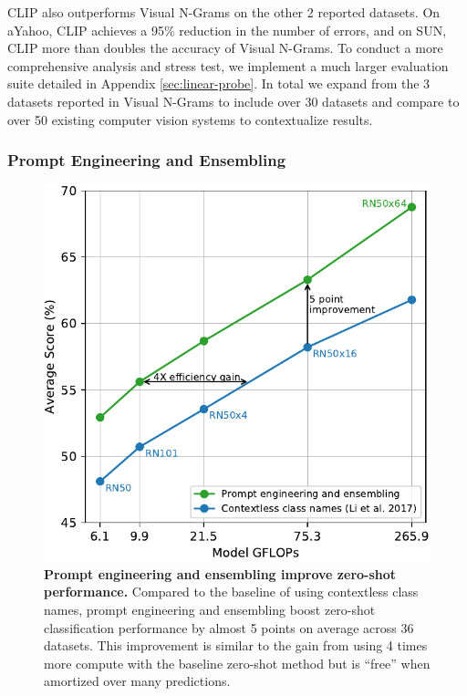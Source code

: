 \documentclass{article}
\begin{document}
CLIP also outperforms Visual N-Grams on the other 2 reported datasets. On aYahoo, CLIP achieves a 95\% reduction in the number of errors, and on SUN, CLIP more than doubles the accuracy of Visual N-Grams. To conduct a more comprehensive analysis and stress test, we implement a much larger evaluation suite detailed in Appendix \ref{sec:linear-probe}. In total we expand from the 3 datasets reported in Visual N-Grams to include over 30 datasets and compare to over 50 existing computer vision systems to contextualize results.

\subsubsection{Prompt Engineering and Ensembling}

\begin{figure}[t]
\begin{center}
\centerline{\includegraphics[width=1.0\columnwidth]{prompt-engineering.pdf}}
\caption{\textbf{Prompt engineering and ensembling improve zero-shot performance.} Compared to the baseline of using contextless class names, prompt engineering and ensembling boost zero-shot classification performance by almost 5 points on average across 36 datasets. This improvement is similar to the gain from using 4 times more compute with the baseline zero-shot method but is ``free'' when amortized over many predictions.}
\label{prompt_engineering}
\end{center}
\vspace{-1em}
\end{figure}
\end{document}
